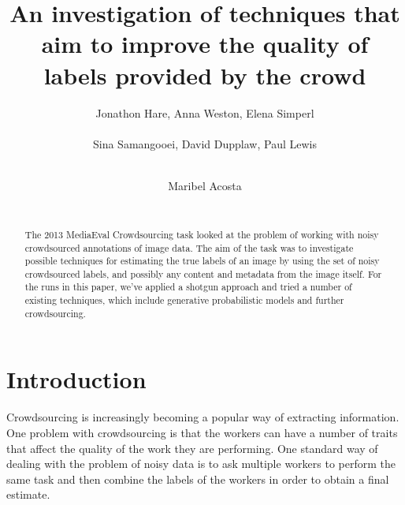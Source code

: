 \documentclass{../acm_proc_article-me11_tweaked}
\begin{document}

\title{An investigation of techniques that aim to improve the quality of labels provided by the crowd}

%
\def\sharedaffiliation{%
\end{tabular}
\begin{tabular}{c}}
%

\author{
	\alignauthor
	Jonathon Hare, Anna Weston, Elena Simperl\\
     \\
	Sina Samangooei, David Dupplaw, Paul Lewis\\
	\\
	\and
	\alignauthor
	Maribel Acosta\\
	 \\
}

\maketitle
\begin{abstract}
The 2013 MediaEval Crowdsourcing task looked at the problem of working with noisy crowdsourced annotations of image data. The aim of the task was to investigate possible techniques for estimating the true labels of an image by using the set of noisy crowdsourced labels, and possibly any content and metadata from the image itself. For the runs in this paper, we've applied a shotgun approach and tried a number of existing techniques, which include generative probabilistic models and further crowdsourcing.
\end{abstract}

\section{Introduction}
Crowdsourcing is increasingly becoming a popular way of extracting information. One problem with crowdsourcing is that the workers can have a number of traits that affect the quality of the work they are performing. One standard way of dealing with the problem of noisy data is to ask multiple workers to perform the same task and then combine the labels of the workers in order to obtain a final estimate.
\end{document}
